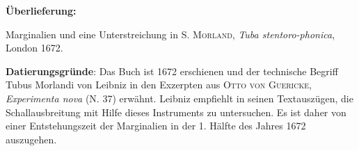       
               
                \begin{ledgroupsized}[r]{120mm}
                \footnotesize 
                \pstart                
                \noindent\textbf{\"{U}berlieferung:}   
                \pend
                \end{ledgroupsized}
            
              
                            \begin{ledgroupsized}[r]{114mm}
                            \footnotesize 
                            \pstart \parindent -6mm
                            Marginalien und eine Unterstreichung in \textsc{S. Morland}, \cite{00149}\textit{Tuba stentoro-phonica}, London 1672. \pend
                            \end{ledgroupsized}
                \vspace*{5mm}
                \begin{ledgroup}
                \footnotesize 
                \pstart
            \noindent\footnotesize{\textbf{Datierungsgr\"{u}nde}: Das Buch ist 1672 erschienen und der technische Begriff Tubus Morlandi von Leibniz in den Exzerpten aus \textsc{Otto von Guericke}, \cite{00055}\textit{Experimenta nova} (N. 37) erw\"{a}hnt. Leibniz empfiehlt in seinen Textausz\"{u}gen, die Schallausbreitung mit Hilfe dieses Instruments zu untersuchen. Es ist daher von einer Entstehungszeit der Marginalien in der 1. H\"{a}lfte des Jahres 1672 auszugehen.}
                \pend
                \end{ledgroup}
            
                \vspace*{8mm}
                \pstart 
                \normalsize
                \pend